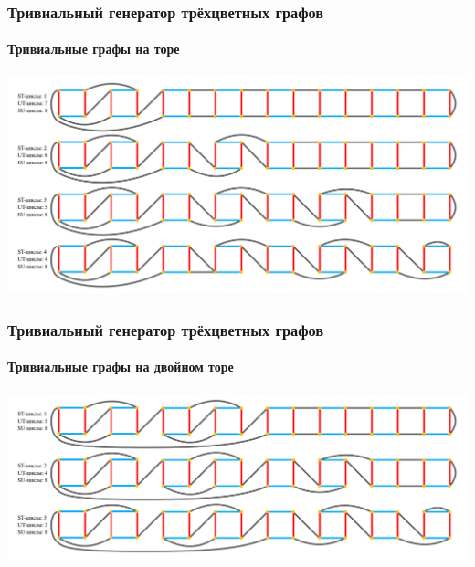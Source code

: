 \documentclass[aspectratio=169]{beamer}
\begin{document}
\begin{frame}
	\frametitle{Тривиальный генератор трёхцветных графов}
	\framesubtitle{Тривиальные графы на торе}
	\includegraphics[width=\columnwidth]{Torus}
\end{frame}
\begin{frame}
	\frametitle{Тривиальный генератор трёхцветных графов}
	\framesubtitle{Тривиальные графы на двойном торе}
	\includegraphics[width=\columnwidth]{Double Torus}
\end{frame}
\end{document}
